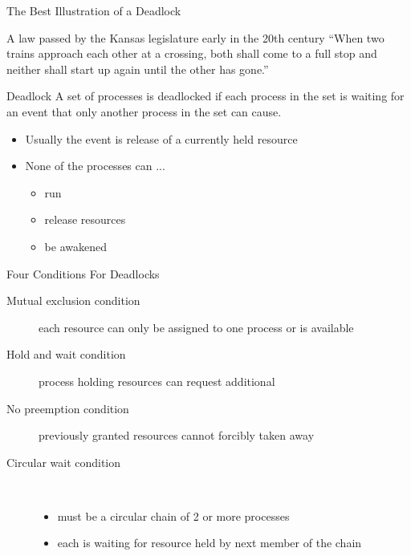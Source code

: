 \begin{frame}{The Best Illustration of a Deadlock}
  \begin{block}{A law passed by the Kansas legislature early in the 20th century}
  ``When two trains approach each other at a crossing, both shall come to a full stop and neither
  shall start up again until the other has gone.''    
  \end{block}  
\end{frame}

\begin{frame}
  \begin{block}{Deadlock}
    A set of processes is deadlocked if each process in the set is waiting for an event
    that only another process in the set can cause.
    \begin{itemize}
    \item Usually the event is release of a currently held resource
    \item None of the processes can ...
      \begin{itemize}
      \item run
      \item release resources
      \item be awakened
      \end{itemize}
    \end{itemize}
  \end{block}
\end{frame}

\begin{frame}{Four Conditions For Deadlocks}
  \begin{description}
  \item[Mutual exclusion condition] each resource can only be assigned to one process or is available
  \item[Hold and wait condition] process holding resources can request additional
  \item[No preemption condition] previously granted resources cannot forcibly taken away
  \item[Circular wait condition] \ 
    \begin{itemize}
    \item must be a circular chain of 2 or more processes
    \item each is waiting for resource held by next member of the chain
    \end{itemize}
  \end{description}
\end{frame}

